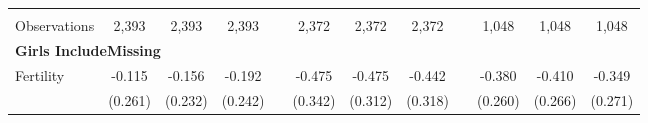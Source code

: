 \begin{landscape}
\begin{table}[htpb!]
\begin{center}
\begin{tabular}{lcccp{2mm}cccp{2mm}ccc}
\begin{footnotesize}\end{footnotesize}&\begin{footnotesize}\end{footnotesize}&\begin{footnotesize}\end{footnotesize}&\begin{footnotesize}\end{footnotesize}&\begin{footnotesize}\end{footnotesize}&\begin{footnotesize}\end{footnotesize}&\begin{footnotesize}\end{footnotesize}&\begin{footnotesize}\end{footnotesize}&\begin{footnotesize}\end{footnotesize}&\begin{footnotesize}\end{footnotesize}&\begin{footnotesize}\end{footnotesize}&\begin{footnotesize}\end{footnotesize}\\Observations&2,393&2,393&2,393&&2,372&2,372&2,372&&1,048&1,048&1,048\\
\multicolumn{12}{l}{\textbf{Girls IncludeMissing}}\\ 
Fertility&-0.115&-0.156&-0.192&&-0.475&-0.475&-0.442&&-0.380&-0.410&-0.349\\
&(0.261)&(0.232)&(0.242)&&(0.342)&(0.312)&(0.318)&&(0.260)&(0.266)&(0.271)\\

\end{tabular}
\end{center}
\end{table}
\end{landscape}
